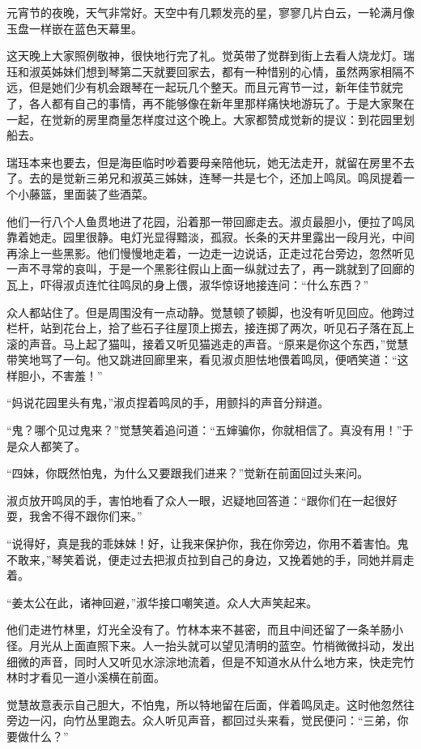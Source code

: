 \par 元宵节的夜晚，天气非常好。天空中有几颗发亮的星，寥寥几片白云，一轮满月像玉盘一样嵌在蓝色天幕里。
\par 这天晚上大家照例敬神，很快地行完了礼。觉英带了觉群到街上去看人烧龙灯。瑞珏和淑英姊妹们想到琴第二天就要回家去，都有一种惜别的心情，虽然两家相隔不远，但是她们少有机会跟琴在一起玩几个整天。而且元宵节一过，新年佳节就完了，各人都有自己的事情，再不能够像在新年里那样痛快地游玩了。于是大家聚在一起，在觉新的房里商量怎样度过这个晚上。大家都赞成觉新的提议：到花园里划船去。
\par 瑞珏本来也要去，但是海臣临时吵着要母亲陪他玩，她无法走开，就留在房里不去了。去的是觉新三弟兄和淑英三姊妹，连琴一共是七个，还加上鸣凤。鸣凤提着一个小藤篮，里面装了些酒菜。
\par 他们一行八个人鱼贯地进了花园，沿着那一带回廊走去。淑贞最胆小，便拉了鸣凤靠着她走。园里很静。电灯光显得黯淡，孤寂。长条的天井里露出一段月光，中间再涂上一些黑影。他们慢慢地走着，一边走一边说话，正走过花台旁边，忽然听见一声不寻常的哀叫，于是一个黑影往假山上面一纵就过去了，再一跳就到了回廊的瓦上，吓得淑贞连忙往鸣凤的身上偎，淑华惊讶地接连问：“什么东西？”
\par 众人都站住了。但是周围没有一点动静。觉慧顿了顿脚，也没有听见回应。他跨过栏杆，站到花台上，拾了些石子往屋顶上掷去，接连掷了两次，听见石子落在瓦上滚的声音。马上起了猫叫，接着又听见猫逃走的声音。“原来是你这个东西，”觉慧带笑地骂了一句。他又跳进回廊里来，看见淑贞胆怯地偎着鸣凤，便哂笑道：“这样胆小，不害羞！”
\par “妈说花园里头有鬼，”淑贞捏着鸣凤的手，用颤抖的声音分辩道。
\par “鬼？哪个见过鬼来？”觉慧笑着追问道：“五婶骗你，你就相信了。真没有用！”于是众人都笑了。
\par “四妹，你既然怕鬼，为什么又要跟我们进来？”觉新在前面回过头来问。
\par 淑贞放开鸣凤的手，害怕地看了众人一眼，迟疑地回答道：“跟你们在一起很好耍，我舍不得不跟你们来。”
\par “说得好，真是我的乖妹妹！好，让我来保护你，我在你旁边，你用不着害怕。鬼不敢来，”琴笑着说，便走过去把淑贞拉到自己的身边，又挽着她的手，同她并肩走着。
\par “姜太公在此，诸神回避，”淑华接口嘲笑道。众人大声笑起来。
\par 他们走进竹林里，灯光全没有了。竹林本来不甚密，而且中间还留了一条羊肠小径。月光从上面直照下来。人一抬头就可以望见清明的蓝空。竹梢微微抖动，发出细微的声音，同时人又听见水淙淙地流着，但是不知道水从什么地方来，快走完竹林时才看见一道小溪横在前面。
\par 觉慧故意表示自己胆大，不怕鬼，所以特地留在后面，伴着鸣凤走。这时他忽然往旁边一闪，向竹丛里跑去。众人听见声音，都回过头来看，觉民便问：“三弟，你要做什么？”
